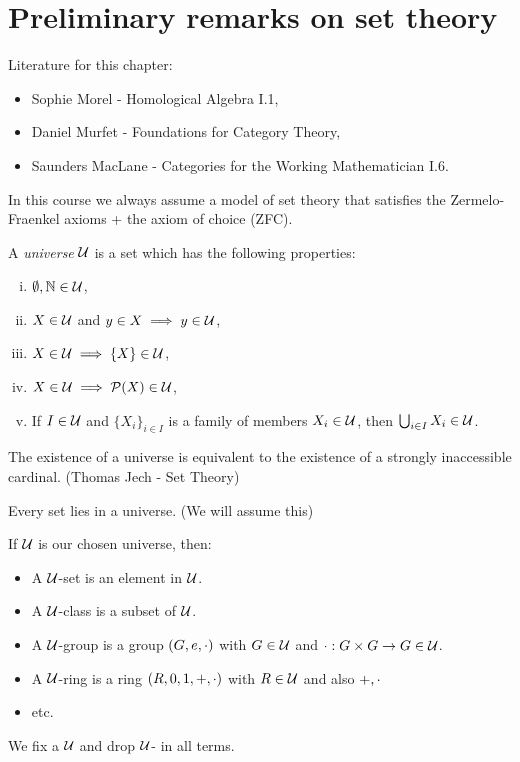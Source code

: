 \documentclass[a4paper]{report}
\begin{document}
\section{Preliminary remarks on set theory}
\begin{refs*}Literature for this chapter:
  \begin{itemize}
\item Sophie Morel - Homological Algebra I.1,
    \item Daniel Murfet - Foundations for Category Theory,
          \item Saunders MacLane - Categories for the Working Mathematician I.6.
  \end{itemize}
  In this course we always assume a model of set theory that satisfies the Zermelo-Fraenkel axioms + the axiom of choice (ZFC).
\end{refs*}
\begin{defi*}
  A \emph{universe} $\mathcal{U}$ is a set which has the following properties:
  \begin{enumerate}[(i)]
    \item $\emptyset, \mathbb{N} \in \mathcal{U}$,
    \item $X \in \mathcal{U}$ and $y \in X \implies y \in \mathcal{U}$,
    \item $X \in \mathcal{U} \implies \{X\} \in \mathcal{U}$,
    \item $X \in \mathcal{U} \implies \mathcal{P}(X) \in \mathcal{U}$,
          \item If $I \in \mathcal{U}$ and $\{X_{i}\}_{i \in I}$ is a family of members $X_{i} \in \mathcal{U}$, then $\bigcup_{i \in I}X_{i} \in \mathcal{U}$.
  \end{enumerate}
The existence of a universe is equivalent to the existence of a strongly inaccessible cardinal. (Thomas Jech - Set Theory)
\end{defi*}

\begin{axiom*}
Every set lies in a universe. (We will assume this)
\end{axiom*}
\begin{defi*}
  If $\mathcal{U}$ is our chosen universe, then:
  \begin{itemize}
    \item A $\mathcal{U}$-set is an element in $\mathcal{U}$.
    \item A $\mathcal{U}$-class is a subset of $\mathcal{U}$.
    \item A $\mathcal{U}$-group is a group $(G,e,\cdot)$ with $G \in \mathcal{U}$ and $\cdot: G \times G \to G \in \mathcal{U}$.
    \item A $\mathcal{U}$-ring is a ring $(R, 0, 1, +, \cdot)$ with $R \in \mathcal{U}$ and also $+, \cdot$
          \item etc.
  \end{itemize}
\end{defi*}
\begin{conv*}
We fix a $\mathcal{U}$ and drop $\mathcal{U}$- in all terms.
\end{conv*}
\end{document}
